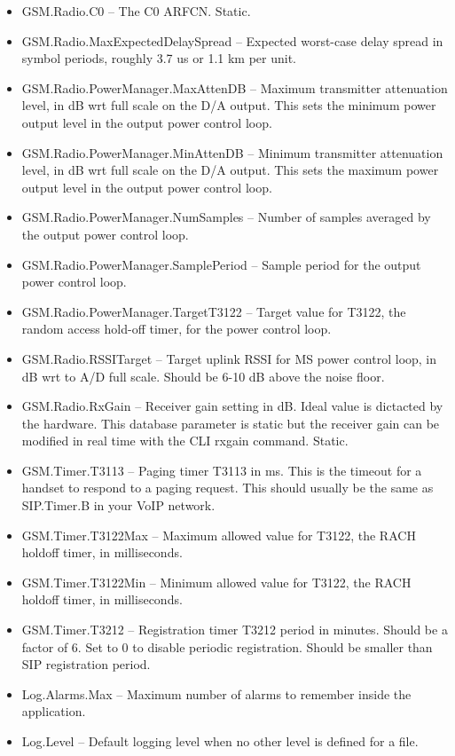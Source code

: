 \documentclass[11pt,openany]{book}
\begin{document}
\begin{itemize}
\item GSM.Radio.C0 -- The C0 ARFCN. Static.
\item GSM.Radio.MaxExpectedDelaySpread -- Expected worst-case delay spread in symbol periods, roughly 3.7 us or 1.1 km per unit.
\item GSM.Radio.PowerManager.MaxAttenDB -- Maximum transmitter attenuation level, in dB wrt full scale on the D/A output.  This sets the minimum power output level in the output power control loop.
\item GSM.Radio.PowerManager.MinAttenDB -- Minimum transmitter attenuation level, in dB wrt full scale on the D/A output.  This sets the maximum power output level in the output power control loop.
\item GSM.Radio.PowerManager.NumSamples -- Number of samples averaged by the output power control loop.
\item GSM.Radio.PowerManager.SamplePeriod -- Sample period for the output power control loop.
\item GSM.Radio.PowerManager.TargetT3122 -- Target value for T3122, the random access hold-off timer, for the power control loop.
\item GSM.Radio.RSSITarget -- Target uplink RSSI for MS power control loop, in dB wrt to A/D full scale.  Should be 6-10 dB above the noise floor.
\item GSM.Radio.RxGain -- Receiver gain setting in dB.  Ideal value is dictacted by the hardware.  This database parameter is static but the receiver gain can be modified in real time with the CLI rxgain command.  Static.
\item GSM.Timer.T3113 -- Paging timer T3113 in ms.  This is the timeout for a handset to respond to a paging request.  This should usually be the same as SIP.Timer.B in your VoIP network.
\item GSM.Timer.T3122Max -- Maximum allowed value for T3122, the RACH holdoff timer, in milliseconds.
\item GSM.Timer.T3122Min -- Minimum allowed value for T3122, the RACH holdoff timer, in milliseconds.
\item GSM.Timer.T3212 -- Registration timer T3212 period in minutes.  Should be a factor of 6.  Set to 0 to disable periodic registration.  Should be smaller than SIP registration period.
\item Log.Alarms.Max -- Maximum number of alarms to remember inside the application.
\item Log.Level -- Default logging level when no other level is defined for a file.

\end{itemize}
\end{document}
